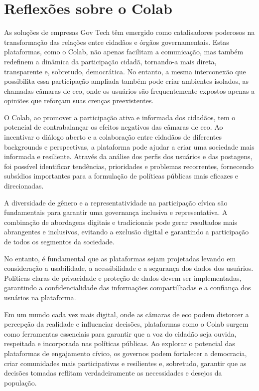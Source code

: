 \section{Reflexões sobre o Colab}

As soluções de empresas Gov Tech têm emergido como catalisadores poderosos na transformação das relações entre cidadãos e órgãos governamentais. Estas plataformas, como o Colab, não apenas facilitam a comunicação, mas também redefinem a dinâmica da participação cidadã, tornando-a mais direta, transparente e, sobretudo, democrática. No entanto, a mesma interconexão que possibilita essa participação ampliada também pode criar ambientes isolados, as chamadas câmaras de eco, onde os usuários são frequentemente expostos apenas a opiniões que reforçam suas crenças preexistentes.

O Colab, ao promover a participação ativa e informada dos cidadãos, tem o potencial de contrabalançar os efeitos negativos das câmaras de eco. Ao incentivar o diálogo aberto e a colaboração entre cidadãos de diferentes backgrounds e perspectivas, a plataforma pode ajudar a criar uma sociedade mais informada e resiliente. Através da análise dos perfis dos usuários e das postagens, foi possível identificar tendências, prioridades e problemas recorrentes, fornecendo subsídios importantes para a formulação de políticas públicas mais eficazes e direcionadas.

A diversidade de gênero e a representatividade na participação cívica são fundamentais para garantir uma governança inclusiva e representativa. A combinação de abordagens digitais e tradicionais pode gerar resultados mais abrangentes e inclusivos, evitando a exclusão digital e garantindo a participação de todos os segmentos da sociedade.

No entanto, é fundamental que as plataformas sejam projetadas levando em consideração a usabilidade, a acessibilidade e a segurança dos dados dos usuários. Políticas claras de privacidade e proteção de dados devem ser implementadas, garantindo a confidencialidade das informações compartilhadas e a confiança dos usuários na plataforma.

Em um mundo cada vez mais digital, onde as câmaras de eco podem distorcer a percepção da realidade e influenciar decisões, plataformas como o Colab surgem como ferramentas essenciais para garantir que a voz do cidadão seja ouvida, respeitada e incorporada nas políticas públicas. Ao explorar o potencial das plataformas de engajamento cívico, os governos podem fortalecer a democracia, criar comunidades mais participativas e resilientes e, sobretudo, garantir que as decisões tomadas reflitam verdadeiramente as necessidades e desejos da população.

